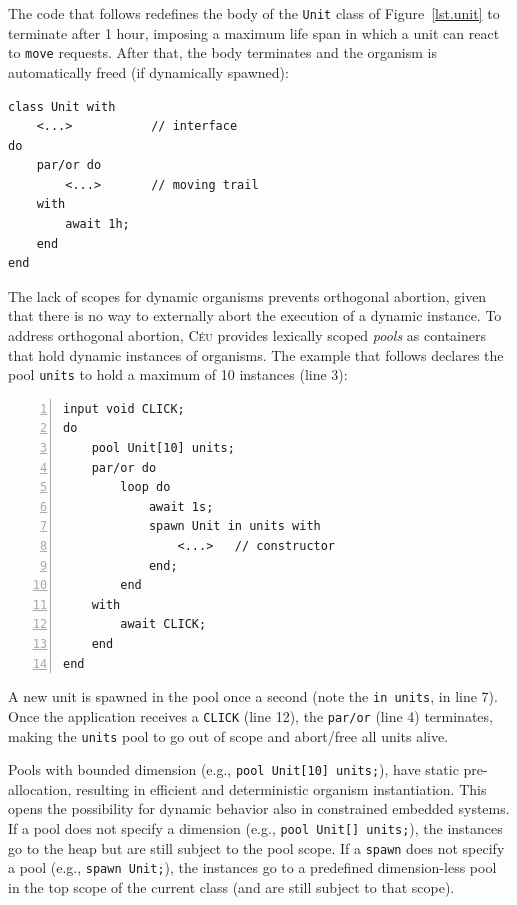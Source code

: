 \documentclass{sigplanconf}
\newcommand{\CEU}{\textsc{C\'{e}u}\xspace}
\newcommand{\code}[1] {{\small{\texttt{#1}}}}
\newcommand{\1}{\;}
\newcommand{\2}{\;\;}
\newcommand{\3}{\;\;\;}
\newcommand{\5}{\;\;\;\;\;}
\begin{document}
The code that follows redefines the body of the \code{Unit} class of 
Figure~\ref{lst.unit} to terminate after 1 hour, imposing a maximum life span 
in which a unit can react to \code{move} requests.
After that, the body terminates and the organism is automatically freed (if 
dynamically spawned):

\begin{lstlisting}
class Unit with
    <...>           // interface
do
    par/or do
        <...>       // moving trail
    with
        await 1h;
    end
end
\end{lstlisting}

The lack of scopes for dynamic organisms prevents orthogonal abortion, given 
that there is no way to externally abort the execution of a dynamic instance.
%
To address orthogonal abortion, \CEU provides lexically scoped \emph{pools} as 
containers that hold dynamic instances of organisms.
%
The example that follows declares the pool \code{units} to hold a maximum of 10 
instances (line 3):


\begin{lstlisting}[numbers=left,xleftmargin=3em]
input void CLICK;
do
    pool Unit[10] units;
    par/or do
        loop do
            await 1s;
            spawn Unit in units with
                <...>   // constructor
            end;
        end
    with
        await CLICK;
    end
end
\end{lstlisting}

A new unit is spawned in the pool once a second (note the \code{in units}, in 
line 7).
Once the application receives a \code{CLICK} (line 12), the \code{par/or} (line 
4) terminates, making the \code{units} pool to go out of scope and abort/free 
all units alive.

Pools with bounded dimension (e.g., \code{pool Unit[10] units;}), have static 
pre-allocation, resulting in efficient and deterministic organism 
instantiation.
This opens the possibility for dynamic behavior also in constrained embedded 
systems.
%
If a pool does not specify a dimension (e.g., \code{pool Unit[] units;}), the 
instances go to the heap but are still subject to the pool scope.
%
If a \code{spawn} does not specify a pool (e.g., \code{spawn Unit;}), the 
instances go to a predefined dimension-less pool in the top scope of the 
current class (and are still subject to that scope).
\end{document}
